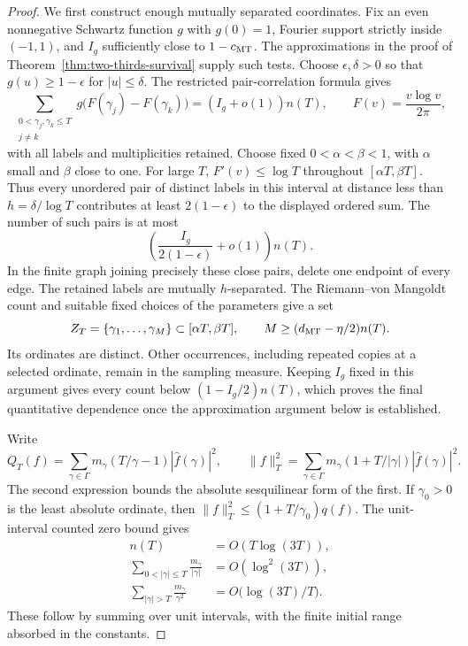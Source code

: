 \begin{proof}
We first construct enough mutually separated coordinates. Fix an even
nonnegative Schwartz function \(g\) with \(g(0)=1\), Fourier support
strictly inside \((-1,1)\), and \(I_g\) sufficiently close to \(1-c_{\rm MT}\).
The approximations in the proof of
Theorem~\ref{thm:two-thirds-survival} supply such tests. Choose
\(\epsilon,\delta>0\) so that
\(g(u)\ge1-\epsilon\) for \(|u|\le\delta\). The restricted
pair-correlation formula gives
\[
 \sum_{\substack{0<\gamma_j,\gamma_k\le T\\j\ne k}}
 g\bigl(F(\gamma_j)-F(\gamma_k)\bigr)
       =(I_g+o(1))n(T),\qquad F(v)=\frac{v\log v}{2\pi},
\]
with all labels and multiplicities retained. Choose fixed
\(0<\alpha<\beta<1\), with \(\alpha\) small and \(\beta\)
close to one. For large \(T\), \(F'(v)\le\log T\) throughout
\([\alpha T,\beta T]\). Thus every unordered pair of distinct
labels in this interval at distance less than
\(h=\delta/\log T\) contributes at least \(2(1-\epsilon)\)
to the displayed ordered sum. The number of such pairs is at most
\[
 \left(\frac{I_g}{2(1-\epsilon)}+o(1)\right)n(T).
\]
In the finite graph joining precisely these close pairs, delete one
endpoint of every edge. The retained labels are mutually
\(h\)-separated. The Riemann--von Mangoldt count and suitable fixed
choices of the parameters give a set
\[
 Z_T=\{\gamma_1,\ldots,\gamma_M\}\subset[\alpha T,\beta T],
 \qquad M\ge(d_{\rm MT}-\eta/2)n(T).
\]
Its ordinates are distinct. Other occurrences, including repeated
copies at a selected ordinate, remain in the sampling measure.
Keeping \(I_g\) fixed in this argument gives every count below
\((1-I_g/2)n(T)\), which proves the final quantitative dependence
once the approximation argument below is established.

Write
\[
 Q_T(f)=\sum_{\gamma\in\Gamma}m_\gamma
             (T/\gamma-1)|\widehat f(\gamma)|^2,
 \qquad
 \|f\|_T^2=\sum_{\gamma\in\Gamma}m_\gamma
             (1+T/|\gamma|)|\widehat f(\gamma)|^2.
\]
The second expression bounds the absolute sesquilinear form of the
first. If \(\gamma_0>0\) is the least absolute ordinate, then
\(\|f\|_T^2\le(1+T/\gamma_0)q(f)\).
The unit-interval counted zero bound gives
\begin{equation}\label{eq:strong-inertia-count-sums}
 \begin{split}
 n(T)&=O(T\log(3T)),\\
 \sum_{0<|\gamma|\le T}\frac{m_\gamma}{|\gamma|}
       &=O(\log^2(3T)),\\
 \sum_{|\gamma|>T}\frac{m_\gamma}{\gamma^2}
       &=O\bigl(\log(3T)/T\bigr).
 \end{split}
\end{equation}
These follow by summing over unit intervals, with the finite initial
range absorbed in the constants.


\end{proof}
